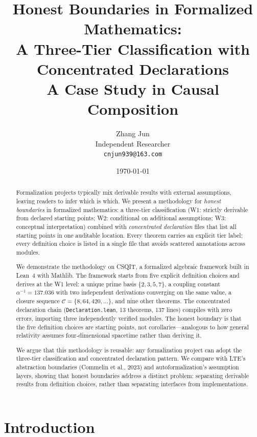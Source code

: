 ﻿\documentclass[11pt]{article}
\title{Honest Boundaries in Formalized Mathematics:\\
A Three-Tier Classification with Concentrated Declarations\\[4pt]
\large A Case Study in Causal Composition}
\author{Zhang Jun\\
Independent Researcher\\
\texttt{cnjun939@163.com}}
\date{\today}
\begin{document}
\maketitle

\begin{abstract}
Formalization projects typically mix derivable results with
external assumptions, leaving readers to infer which is which.
We present a methodology for \emph{honest boundaries} in
formalized mathematics: a three-tier classification (W1:
strictly derivable from declared starting points; W2:
conditional on additional assumptions; W3: conceptual
interpretation) combined with \emph{concentrated
declaration} files that list all starting points in one
auditable location. Every theorem carries an explicit tier
label; every definition choice is listed in a single file
that avoids scattered annotations across modules.

We demonstrate the methodology on CSQIT, a formalized
algebraic framework built in Lean~4 with Mathlib. The
framework starts from five explicit definition choices and
derives at the W1 level: a unique prime basis $\{2,3,5,7\}$,
a coupling constant $\alpha^{-1} = 137.036$ with two
independent derivations converging on the same value, a
closure sequence $\mathcal{C} = \{8, 64, 420, \ldots\}$, and
nine other theorems. The concentrated declaration chain
(\texttt{Declaration.lean}, 13 theorems, 137 lines) compiles
with zero errors, importing three independently verified
modules. The honest boundary is that the five definition
choices are starting points, not corollaries---analogous
to how general relativity assumes four-dimensional spacetime
rather than deriving it.

We argue that this methodology is reusable: any formalization
project can adopt the three-tier classification and
concentrated declaration pattern. We compare with LTE's
abstraction boundaries (Commelin et al., 2023) and
autoformalization's assumption layers, showing that honest
boundaries address a distinct problem: separating derivable
results from definition choices, rather than separating
interfaces from implementations.
\end{abstract}

\tableofcontents

\section{Introduction}
\end{document}
